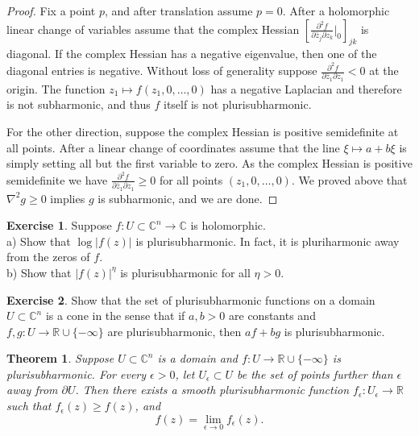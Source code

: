 \documentclass[12pt,openany]{book}
\newcommand{\sabs}[1]{\lvert {#1} \rvert}
\newcommand{\C}{{\mathbb{C}}}
\newcommand{\R}{{\mathbb{R}}}
\theoremstyle{plain}
\newtheorem{thm}{Theorem}[section]
\theoremstyle{remark}
\theoremstyle{definition}
\newenvironment{exbox}{%
    \def\FrameCommand{\vrule width 1pt \relax\hspace {10pt}}%
    \MakeFramed {\advance \hsize -\width \FrameRestore }%
}{%
    \endMakeFramed
}
\theoremstyle{exercise}
\newtheorem{exercise}{Exercise}[section]
\theoremstyle{example}
\begin{document}
\begin{proof}
Fix a point $p$, and after translation assume $p=0$.
After a holomorphic linear change of variables assume that
the complex Hessian
$\left[
\frac{\partial^2 f}{\partial \bar{z}_j \partial z_k}
\Big|_0
\right]_{jk}$ is diagonal.  If the complex Hessian has a negative eigenvalue, then
one of the diagonal entries is negative.
Without loss of generality suppose
$\frac{\partial^2 f}{\partial \bar{z}_1 \partial z_1} < 0$ at the origin.
The function $z_1 \mapsto f(z_1,0,\ldots,0)$ has
a negative Laplacian and therefore is not subharmonic, and thus $f$ itself
is not plurisubharmonic.

For the other direction, suppose the complex Hessian is positive
semidefinite at all points.
After a linear change of coordinates assume that the
line $\xi \mapsto a+b\xi$ is simply setting all but the first variable to
zero.  As the complex Hessian is positive semidefinite we have
$\frac{\partial^2 f}{\partial \bar{z}_1 \partial z_1} \geq 0$ for all
points $(z_1,0,\ldots,0)$.  We proved above that $\nabla^2 g \geq 0$
implies $g$ is subharmonic, and we are done.
\end{proof}

\begin{exbox}
\begin{exercise} \label{exercise:modholplush}
Suppose $f \colon U \subset \C^n \to \C$ is holomorphic.
\\
a) Show that $\log \sabs{f(z)}$ is plurisubharmonic.  In fact, it is pluriharmonic away from the zeros of $f$.
\\
b) Show that $\sabs{f(z)}^{\eta}$ is plurisubharmonic for all $\eta > 0$.
\end{exercise}

\begin{exercise}
Show that the set of plurisubharmonic functions on a domain $U \subset \C^n$
is a cone in the sense that if $a,b > 0$ are constants and
$f, g \colon U \to \R \cup \{ -\infty \}$ are plurisubharmonic, then
$a f + b g$ is plurisubharmonic.
\end{exercise}
\end{exbox}

\begin{thm} \label{thm:subharlim}
Suppose $U \subset \C^n$ is a domain and $f \colon U \to \R \cup \{
-\infty \}$ is plurisubharmonic.  For every $\epsilon > 0$,
let $U_\epsilon \subset U$
be the set of points further than $\epsilon$ away from $\partial U$.
Then there exists a smooth plurisubharmonic function
$f_\epsilon \colon U_\epsilon \to \R$ such that $f_\epsilon(z) \geq
f(z)$, and
\begin{equation*}
f(z) = \lim_{\epsilon \to 0} f_\epsilon(z) .
\end{equation*}
\end{thm}
\end{document}
